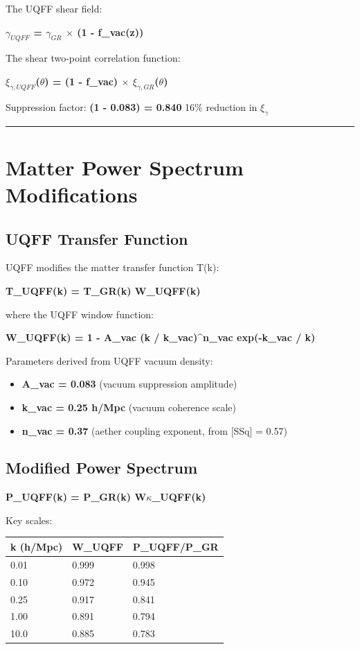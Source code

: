 \documentclass[12pt,a4paper]{article}
\begin{document}
The UQFF shear field:

\textbf{$\gamma_{UQFF}$ = $\gamma_{GR}$ $\times$ (1 - f\_vac(z))}

The shear two-point correlation function:

\textbf{$\xi_{\gamma,UQFF}$($\theta$) = (1 - f\_vac) $\times$ $\xi_{\gamma,GR}$($\theta$)}

Suppression factor: \textbf{(1 - 0.083) = 0.840}  16\% reduction in $\xi_\gamma$

\medskip\hrule\medskip

\section{Matter Power Spectrum Modifications}

\subsection{UQFF Transfer Function}

UQFF modifies the matter transfer function T(k):

\textbf{T\_UQFF(k) = T\_GR(k)  W\_UQFF(k)}

where the UQFF window function:

\textbf{W\_UQFF(k) = 1 - A\_vac  (k / k\_vac)\^{}n\_vac  exp(-k\_vac / k)}

Parameters derived from UQFF vacuum density:

\begin{itemize}
  \item \textbf{A\_vac = 0.083} (vacuum suppression amplitude)  
  \item \textbf{k\_vac = 0.25 h/Mpc} (vacuum coherence scale)  
  \item \textbf{n\_vac = 0.37} (aether coupling exponent, from [SSq] = 0.57)
\end{itemize}

\subsection{Modified Power Spectrum}

\textbf{P\_UQFF(k) = P\_GR(k)  W$\kappa$\_UQFF(k)}

Key scales:

\begin{center}
\begin{longtable}{@{}lll@{}}
\toprule
k (h/Mpc) & W\_UQFF & P\_UQFF/P\_GR \tabularnewline
\midrule
\endhead
0.01 & 0.999 & 0.998 \tabularnewline
0.10 & 0.972 & 0.945 \tabularnewline
0.25 & 0.917 & 0.841 \tabularnewline
1.00 & 0.891 & 0.794 \tabularnewline
10.0 & 0.885 & 0.783 \tabularnewline
\bottomrule
\end{longtable}
\end{center}
\end{document}
